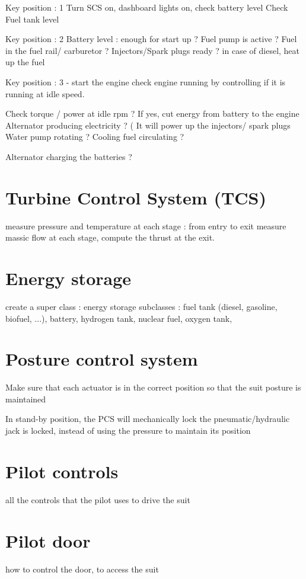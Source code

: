 \documentclass[12pt,a4paper]{article}
\begin{document}
Key position : 1
Turn SCS on, dashboard lights on, check battery level
Check Fuel tank level 

Key position : 2
Battery level : enough for start up ?
Fuel pump is active ? 
Fuel in the fuel rail/ carburetor ?
Injectors/Spark plugs ready ?
in case of diesel, heat up the fuel 

Key position : 3
- start the engine
check engine running by controlling if it is running at idle speed. 

Check torque / power at idle rpm ?
If yes, cut energy from battery to the engine
Alternator producing electricity ? ( It will power up the injectors/ spark plugs
Water pump rotating ? Cooling fuel circulating ?

Alternator charging the batteries ?

\section{Turbine Control System (TCS)}
measure pressure and temperature at each stage : from entry to exit
measure massic flow at each stage, compute the thrust at the exit. 

\section{Energy storage}
create a super class : energy storage
subclasses : fuel tank (diesel, gasoline, biofuel, ...), battery, hydrogen tank, nuclear fuel, oxygen tank,


\section{Posture control system}

Make sure that each actuator is in the correct position so that the suit posture is maintained

In stand-by position, the PCS will mechanically lock the pneumatic/hydraulic jack is locked, instead of using the pressure to maintain its position

\section{Pilot controls}
 all the controls that the pilot uses to drive the suit

\section{Pilot door}
how to control the door, to access the suit
\end{document}
